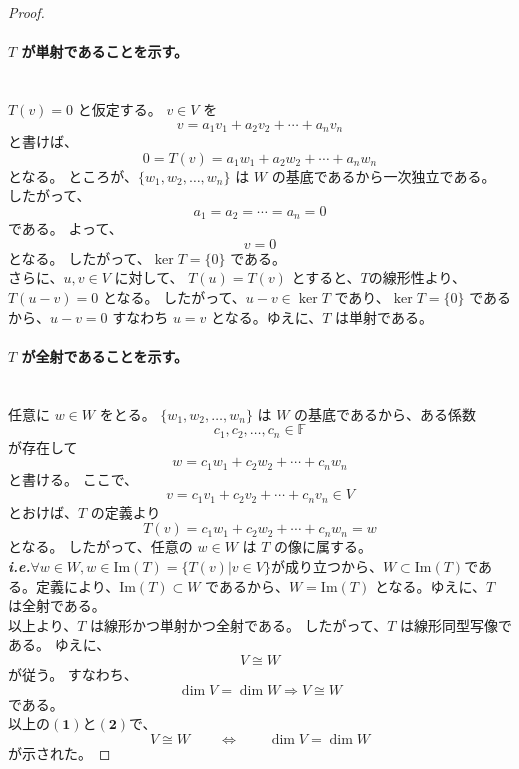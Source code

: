 \documentclass[dvipdfmx,a4paper]{jsarticle}
\makeatletter
\newcommand*{\ie}{\textbf{\textit{i.e.}}\@\xspace}
\theoremstyle{mystyle}
\makeatother
\begin{document}
\begin{proof}
\paragraph{\textbf{$T$ が単射であることを示す。}} \ \\
$T(v)=0$ と仮定する。
$v\in V$ を
\[
v=a_1v_1+a_2v_2+\cdots+a_nv_n
\]
と書けば、
\[
0=T(v)=a_1w_1+a_2w_2+\cdots+a_nw_n
\]
となる。
ところが、$\{w_1,w_2,\dots,w_n\}$ は $W$ の基底であるから一次独立である。
したがって、
\[
a_1=a_2=\cdots=a_n=0
\]
である。
よって、
\[
v=0
\]
となる。
したがって、$\ker T=\{0\}$ である。\\
\noindent
さらに、$u,v\in V$ に対して、
$T(u) = T(v)$ とすると、$T$の線形性より、$T(u-v) = 0$ となる。
したがって、$u-v \in \ker T$ であり、$\ker T=\{0\}$ であるから、$u-v=0$ すなわち $u=v$ となる。ゆえに、$T$ は単射である。

\paragraph{\textbf{$T$ が全射であることを示す。}} \ \\
任意に $w\in W$ をとる。
$\{w_1,w_2,\dots,w_n\}$ は $W$ の基底であるから、ある係数
\[
c_1,c_2,\dots,c_n\in\mathbb{F}
\]
が存在して
\[
w=c_1w_1+c_2w_2+\cdots+c_nw_n
\]
と書ける。
ここで、
\[
v=c_1v_1+c_2v_2+\cdots+c_nv_n \in V
\]
とおけば、$T$ の定義より
\[
T(v)=c_1w_1+c_2w_2+\cdots+c_nw_n=w  
\]
となる。
したがって、任意の $w\in W$ は $T$ の像に属する。\\
\noindent
\ie $\forall w \in W, w\in \mathrm{Im}(T) = \{T(v) |v \in V\}$が成り立つから、$W \subset \mathrm{Im}(T)$である。定義により、$\mathrm{Im}(T) \subset W$ であるから、$W = \mathrm{Im}(T)$ となる。ゆえに、$T$ は全射である。\\[0.5em]
以上より、$T$ は線形かつ単射かつ全射である。
したがって、$T$ は線形同型写像である。
ゆえに、
\[
V\cong W
\]
が従う。
すなわち、
\[
\dim V=\dim W \Longrightarrow V\cong W
\]
である。\\[1.5em]
以上の$\mathbf{(1)}$と$\mathbf{(2)}$で、
\[
V \cong W
\qquad \Longleftrightarrow \qquad
\dim V=\dim W
\]
が示された。
\end{proof}
\end{document}
